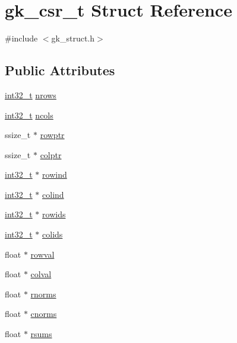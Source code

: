 \hypertarget{a00634}{}\section{gk\+\_\+csr\+\_\+t Struct Reference}
\label{a00634}


{\ttfamily \#include $<$gk\+\_\+struct.\+h$>$}

\subsection*{Public Attributes}
\begin{DoxyCompactItemize}
\item 
\hyperlink{a00119_a37994e3b11c72957c6f454c6ec96d43d}{int32\+\_\+t} \hyperlink{a00634_a41a9fdec2897ac85c0adb3bf682f2e05}{nrows}
\item 
\hyperlink{a00119_a37994e3b11c72957c6f454c6ec96d43d}{int32\+\_\+t} \hyperlink{a00634_ae5538bf8d2abd4db9d7e7539fb55f7bd}{ncols}
\item 
ssize\+\_\+t $\ast$ \hyperlink{a00634_ab82e0c356c0bd80e9cb55c2c6c087fff}{rowptr}
\item 
ssize\+\_\+t $\ast$ \hyperlink{a00634_af0cacdb3930ebf5c9dd9f38fb7b60205}{colptr}
\item 
\hyperlink{a00119_a37994e3b11c72957c6f454c6ec96d43d}{int32\+\_\+t} $\ast$ \hyperlink{a00634_a5dc63718b2bc7a37633af72bb5bb1920}{rowind}
\item 
\hyperlink{a00119_a37994e3b11c72957c6f454c6ec96d43d}{int32\+\_\+t} $\ast$ \hyperlink{a00634_a7ec1d81e61053234c9d42fb6913d0e9f}{colind}
\item 
\hyperlink{a00119_a37994e3b11c72957c6f454c6ec96d43d}{int32\+\_\+t} $\ast$ \hyperlink{a00634_a67793a3dd041410532a1c04a1cb0de7e}{rowids}
\item 
\hyperlink{a00119_a37994e3b11c72957c6f454c6ec96d43d}{int32\+\_\+t} $\ast$ \hyperlink{a00634_ad03b1a0a39247c0de8d2746b8f9b9c51}{colids}
\item 
float $\ast$ \hyperlink{a00634_a7a80bc12a274ee31af6a5797ddbf13f3}{rowval}
\item 
float $\ast$ \hyperlink{a00634_a62f3433aa0b366a74e6c4b3847bb5cca}{colval}
\item 
float $\ast$ \hyperlink{a00634_a0b0e31ffd5f815a8521ebda5cfb889ad}{rnorms}
\item 
float $\ast$ \hyperlink{a00634_a7fce0eac524c7f5c889b6c44a3ee41fb}{cnorms}
\item 
float $\ast$ \hyperlink{a00634_a6b19f0b4ae40c82ad60c7aa7666c6f4f}{rsums}

\end{DoxyCompactItemize}
